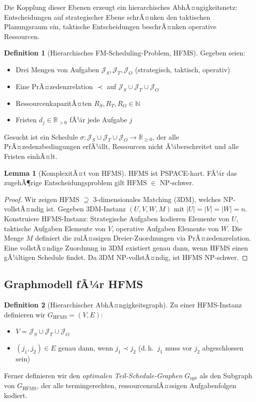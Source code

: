﻿\documentclass[a4paper,12pt]{article}
\theoremstyle{definition}
\newtheorem{definition}{Definition}[section]
\newtheorem{lemma}{Lemma}[section]
\begin{document}
Die Kopplung dieser Ebenen erzeugt ein hierarchisches AbhÃ¤ngigkeitsnetz:
Entscheidungen auf strategischer Ebene schrÃ¤nken den taktischen Planungsraum ein,
taktische Entscheidungen beschrÃ¤nken operative Ressourcen.

\begin{definition}[Hierarchisches FM-Scheduling-Problem, HFMS]
\label{def:hfms}
Gegeben seien:
\begin{itemize}
    \item Drei Mengen von Aufgaben $\mathcal{J}_S, \mathcal{J}_T, \mathcal{J}_O$
          (strategisch, taktisch, operativ)
    \item Eine PrÃ¤zedenzrelation $\prec$ auf $\mathcal{J}_S \cup \mathcal{J}_T \cup \mathcal{J}_O$
    \item RessourcenkapazitÃ¤ten $R_S, R_T, R_O \in \mathbb{N}$
    \item Fristen $d_j \in \mathbb{R}_{>0}$ fÃ¼r jede Aufgabe $j$
\end{itemize}
Gesucht ist ein Schedule $\sigma: \mathcal{J}_S \cup \mathcal{J}_T \cup \mathcal{J}_O \to \mathbb{R}_{\geq 0}$,
der alle PrÃ¤zedenzbedingungen erfÃ¼llt, Ressourcen nicht Ã¼berschreitet und alle Fristen einhÃ¤lt.
\end{definition}

\begin{lemma}[KomplexitÃ¤t von HFMS]
\label{lem:hfms-np}
HFMS ist PSPACE-hart. FÃ¼r das zugehÃ¶rige Entscheidungsproblem gilt HFMS $\in$ NP-schwer.
\end{lemma}

\begin{proof}
Wir zeigen HFMS $\supseteq$ 3-dimensionales Matching (3DM), welches NP-vollstÃ¤ndig ist.
Gegeben 3DM-Instanz $(U, V, W, M)$ mit $|U| = |V| = |W| = n$.
Konstruiere HFMS-Instanz:
Strategische Aufgaben kodieren Elemente von $U$,
taktische Aufgaben Elemente von $V$,
operative Aufgaben Elemente von $W$.
Die Menge $M$ definiert die zulÃ¤ssigen Dreier-Zuordnungen via PrÃ¤zedenzrelation.
Eine vollstÃ¤ndige Zuordnung in 3DM existiert genau dann, wenn HFMS einen
gÃ¼ltigen Schedule findet. Da 3DM NP-vollstÃ¤ndig, ist HFMS NP-schwer.
\end{proof}

\subsection{Graphmodell fÃ¼r HFMS}

\begin{definition}[Hierarchischer AbhÃ¤ngigkeitsgraph]
\label{def:hag}
Zu einer HFMS-Instanz definieren wir $G_{\mathrm{HFMS}} = (V, E)$:
\begin{itemize}
    \item $V = \mathcal{J}_S \cup \mathcal{J}_T \cup \mathcal{J}_O$
    \item $(j_1, j_2) \in E$ genau dann, wenn $j_1 \prec j_2$
          (d.\,h.\ $j_1$ muss vor $j_2$ abgeschlossen sein)
\end{itemize}
Ferner definieren wir den \emph{optimalen Teil-Schedule-Graphen} $G_{\mathrm{opt}}$
als den Subgraph von $G_{\mathrm{HFMS}}$, der alle termingerechten, ressourcenzulÃ¤ssigen
Aufgabenfolgen kodiert.
\end{definition}
\end{document}

